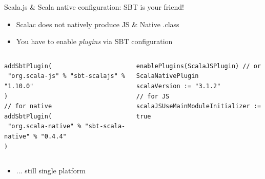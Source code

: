 \documentclass[presentation, 9pt]{beamer}\mode<presentation>{\usetheme{AMSBolognaFC}}
\begin{document}
\begin{frame}[fragile]{Scala.js \& Scala native configuration: SBT is your friend! \href{https://github.com/unibo-pps/scala-native-js-configuration}{\faLink}}
	\begin{itemize}
		\item Scalac does not natively produce JS \& Native .class
  	\item You have to enable \emph{plugins} via SBT configuration 
	\end{itemize}
	\begin{columns}
		\begin{column}[c]{0.5\textwidth}
			\begin{tcolorbox}[left=0pt, top=0pt, bottom=0pt, title=project/plugins.sbt]
				\begin{verbatim}
addSbtPlugin(
 "org.scala-js" % "sbt-scalajs" % "1.10.0"
)
// for native
addSbtPlugin(
 "org.scala-native" % "sbt-scala-native" % "0.4.4"
)
				\end{verbatim}
			\end{tcolorbox}
		\end{column}

		\begin{column}[c]{0.5\textwidth}
			\begin{tcolorbox}[left=0pt, top=0pt, bottom=0pt, title=build.sbt]
				\begin{verbatim}
enablePlugins(ScalaJSPlugin) // or ScalaNativePlugin
scalaVersion := "3.1.2"
// for JS
scalaJSUseMainModuleInitializer := true
				\end{verbatim}
			\end{tcolorbox}
		\end{column}
	\end{columns}
	
	\begin{itemize}
		\item ... still single platform
	\end{itemize}
\end{frame}
\end{document}
